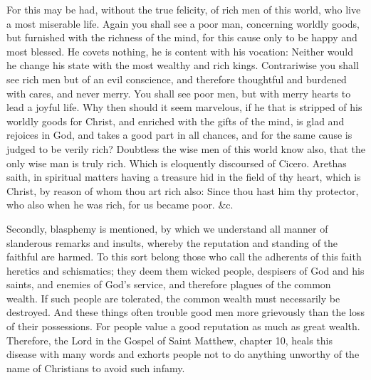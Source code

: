 For this may be had, without the true felicity, of rich men of this world, who live a most miserable life. Again you shall see a poor man, concerning worldly goods, but furnished with the richness of the mind, for this cause only to be happy and most blessed. He covets nothing, he is content with his vocation: Neither would he change his state with the most wealthy and rich kings. Contrariwise you shall see rich men but of an evil conscience, and therefore thoughtful and burdened with cares, and never merry. You shall see poor men, but with merry hearts to lead a joyful life. Why then should it seem marvelous, if he that is stripped of his worldly goods for Christ, and enriched with the gifts of the mind, is glad and rejoices in God, and takes a good part in all chances, and for the same cause is judged to be verily rich? Doubtless the wise men of this world know also, that the only wise man is truly rich. Which is eloquently discoursed of Cicero. Arethas saith, in spiritual matters having a treasure hid in the field of thy heart, which is Christ, by reason of whom thou art rich also: Since thou hast him thy protector, who also when he was rich, for us became poor. \&c.

Secondly, blasphemy is mentioned, by which we understand all manner of slanderous remarks and insults, whereby the reputation and standing of the faithful are harmed. To this sort belong those who call the adherents of this faith heretics and schismatics; they deem them wicked people, despisers of God and his saints, and enemies of God’s service, and therefore plagues of the common wealth. If such people are tolerated, the common wealth must necessarily be destroyed. And these things often trouble good men more grievously than the loss of their possessions. For people value a good reputation as much as great wealth. Therefore, the Lord in the Gospel of Saint Matthew, chapter 10, heals this disease with many words and exhorts people not to do anything unworthy of the name of Christians to avoid such infamy.

